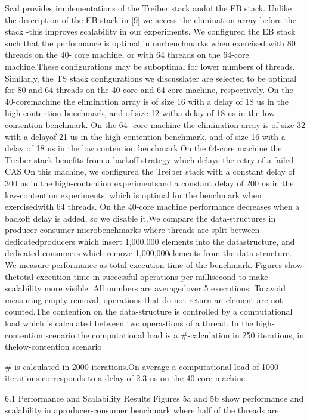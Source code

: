 Scal provides implementations of the Treiber stack andof the EB stack. Unlike the description of the EB stack
in [9] we access the elimination array before the stack -this improves scalability in our experiments. We configured
the EB stack such that the performance is optimal in ourbenchmarks when exercised with 80 threads on the 40-
core machine, or with 64 threads on the 64-core machine.These configurations may be suboptimal for lower numbers
of threads. Similarly, the TS stack configurations we discusslater are selected to be optimal for 80 and 64 threads on the
40-core and 64-core machine, respectively. On the 40-coremachine the elimination array is of size 16 with a delay of
18 us in the high-contention benchmark, and of size 12 witha delay of 18 us in the low contention benchmark. On the 64-
core machine the elimination array is of size 32 with a delayof 21 us in the high-contention benchmark, and of size 16
with a delay of 18 us in the low contention benchmark.On the 64-core machine the Treiber stack benefits from
a backoff strategy which delays the retry of a failed CAS.On this machine, we configured the Treiber stack with a
constant delay of 300 us in the high-contention experimentsand a constant delay of 200 us in the low-contention experiments, which is optimal for the benchmark when exercisedwith 64 threads. On the 40-core machine performance decreases when a backoff delay is added, so we disable it.We compare the data-structures in producer-consumer
microbenchmarks where threads are split between dedicatedproducers which insert 1,000,000 elements into the datastructure, and dedicated consumers which remove 1,000,000elements from the data-structure. We measure performance
as total execution time of the benchmark. Figures show thetotal execution time in successful operations per millisecond
to make scalability more visible. All numbers are averagedover 5 executions. To avoid measuring empty removal, operations that do not return an element are not counted.The contention on the data-structure is controlled by a
computational load which is calculated between two opera-tions of a thread. In the high-contention scenario the computational load is a #-calculation in 250 iterations, in thelow-contention scenario

# is calculated in 2000 iterations.On average a computational load of 1000 iterations corresponds to a delay of 2.3 us on the 40-core machine.

6.1 Performance and Scalability Results
Figures 5a and 5b show performance and scalability in aproducer-consumer benchmark where half of the threads are

